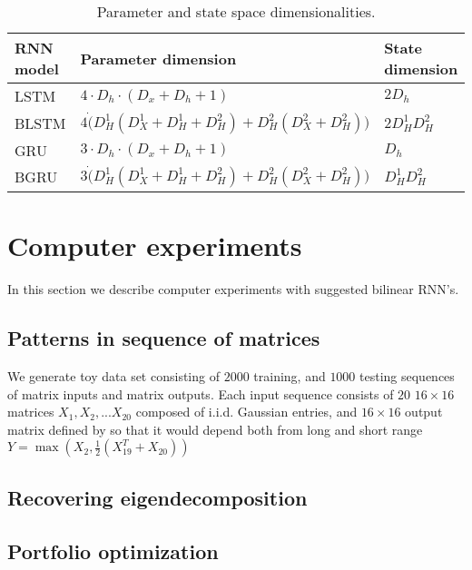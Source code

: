 \documentclass[a4paper,11pt]{article}
\begin{document}
\begin{table}
\begin{tabular}{ |l|l|l| }
  \hline
   RNN model & Parameter dimension & State dimension \\
  \hline   
   LSTM & $ 4 \cdot D_{h} \cdot (D_{x}  + D_{h} + 1)$  & $2D_{h}$ \\
  \hline   
   BLSTM & 	$4 \dot ( D_{H}^{1} (D_{X}^{1} + D_{H}^{1} + D_{H}^{2}) + D_{H}^{2} (D_{X}^{2} + D_{H}^{2}))$ & $2 D_{H}^{1} D_{H}^{2}$\\
  \hline   
   GRU & $ 3 \cdot D_{h} \cdot (D_{x}  + D_{h} + 1) $ & $D_{h}$ \\      
  \hline   
   BGRU & 	$3 \dot ( D_{H}^{1} (D_{X}^{1} + D_{H}^{1} + D_{H}^{2}) + D_{H}^{2} (D_{X}^{2} + D_{H}^{2}))$ & $ D_{H}^{1} D_{H}^{2}$\\
  \hline
\end{tabular}
  \caption{Parameter and state space dimensionalities.}
\label{table:parameters_and_states}
\end{table}




\section{Computer experiments}

In this section we describe computer experiments with suggested bilinear RNN's.

\subsection{Patterns in sequence of matrices}

We generate toy data set consisting of $2000$ training, and $1000$ testing 
sequences of matrix inputs and matrix outputs. Each input sequence consists of $20$
$16 \times 16$ matrices $X_{1}, X_{2}, ... X_{20}$ composed of i.i.d. Gaussian entries, and $16 \times 16$ output matrix defined by so that it would depend both from long and short range $Y = \max(X_{2}, \frac{1}{2} (X_{19}^{T} + X_{20}))$

\subsection{Recovering eigendecomposition}
\subsection{Portfolio optimization}
\end{document}
